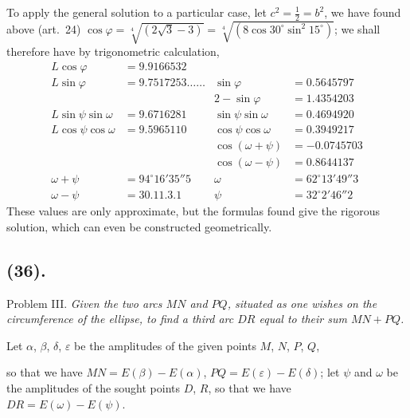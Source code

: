 \documentclass{article}
\begin{document}
To apply the general solution to a particular case, let $c^{2}=\frac{1}{2}=b^{2}$, we have found above (art.~24) $\cos\varphi=\sqrt[4]{(2\sqrt{3}-3)}=\sqrt[4]{(8\cos 30^{\circ}\sin^{2}15^{\circ})}$; we shall therefore have by trigonometric calculation,
\[ \begin{aligned} L\cos\varphi&=9.9166532 & &\\ L\sin\varphi&=9.7517253\ldots\ldots & \sin\varphi&=0.5645797\\ & & 2-\sin\varphi&=1.4354203\\ L\sin\psi\sin\omega&=9.6716281 & \sin\psi\sin\omega&=0.4694920\\ L\cos\psi\cos\omega&=9.5965110 & \cos\psi\cos\omega&=0.3949217\\ & & \cos(\omega+\psi)&=-0.0745703\\ & & \cos(\omega-\psi)&=0.8644137\\ \omega+\psi&=94^{\circ}16'35''5 & \omega&=62^{\circ}13'49''3\\ \omega-\psi&=30.11.3.1 & \psi&=32^{\circ}2'46''2 \end{aligned} \]
These values are only approximate, but the formulas found give the rigorous solution, which can even be constructed geometrically.


\subsection*{(36).}

Problem III. \emph{Given the two arcs $MN$ and $PQ$, situated as one wishes on the circumference of the ellipse, to find a third arc $DR$ equal to their sum $MN+PQ$.}

Let $\alpha$, $\beta$, $\delta$, $\varepsilon$ be the amplitudes of the given points $M$, $N$, $P$, $Q$,

so that we have $MN=E(\beta)-E(\alpha)$, $PQ=E(\varepsilon)-E(\delta)$; let $\psi$ and $\omega$ be the amplitudes of the sought points $D$, $R$, so that we have $DR=E(\omega)-E(\psi)$.
\end{document}
